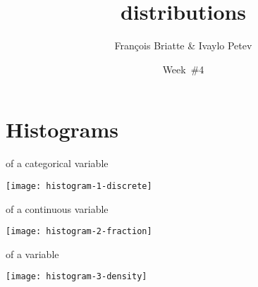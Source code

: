 \documentclass[t]{beamer}
\title{distributions}
\author{François Briatte \& Ivaylo Petev}
\date{Week~\#4}
\begin{document}

	\section{Histograms}
	
	\begin{frame}[t]{ of a categorical variable}

		\begin{center}
			\texttt{[image: histogram-1-discrete]}
		\end{center}

	\end{frame}

	\begin{frame}[t]{ of a continuous variable}

		\begin{center}
			\texttt{[image: histogram-2-fraction]}
		\end{center}

	\end{frame}

	\begin{frame}[t]{ of a variable}

		\begin{center}
			\texttt{[image: histogram-3-density]}
		\end{center}

	\end{frame}
\end{document}
